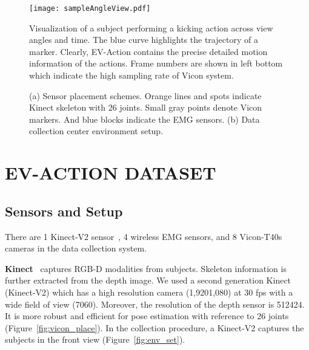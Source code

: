 \documentclass[a4paper, 10pt, conference]{ieeeconf}      \usepackage{FG2020}
\begin{document}
\begin{figure*}[!tp]
\centering
\texttt{[image: sampleAngleView.pdf]}
\vspace{-6mm}
\caption{Visualization of a subject performing a kicking action across view angles and time. The blue curve highlights the trajectory of a marker. Clearly, EV-Action contains the precise detailed motion information of the actions. Frame numbers are shown in left bottom which indicate the high sampling rate of Vicon system.}\label{fig:angles}
\vspace{-4mm}
\end{figure*}

\begin{figure}[!tp]
\centering
{}
\vspace{-2mm}
\vspace{-1mm}
\caption{(a) Sensor placement schemes. Orange lines and spots indicate Kinect skeleton with 26 joints. Small gray points denote Vicon markers. And blue blocks indicate the EMG sensors. (b) Data collection center environment setup.}\label{fig:3places}
\vspace{-4mm}
\end{figure}


\section{EV-ACTION DATASET}

\subsection{Sensors and Setup}
There are 1 Kinect-V2 sensor~\cite{kinect2_acc}, 4 wireless EMG sensors, and 8 Vicon-T40s cameras in the data collection system.

\textbf{Kinect}~\cite{kinect2_acc} captures RGB-D modalities from subjects. Skeleton information is further extracted from the depth image. We used a second generation Kinect~\cite{kinect2_acc,kinect_v1v2} (Kinect-V2) which has a high resolution camera (1,9201,080) at 30 fps with a wide field of view (7060). Moreover, the resolution of the depth sensor is 512424. It is more robust and efficient for pose estimation with reference to 26 joints (Figure~\ref{fig:vicon_place}). In the collection procedure, a Kinect-V2 captures the subjects in the front view (Figure~\ref{fig:env_set}).
\end{document}
